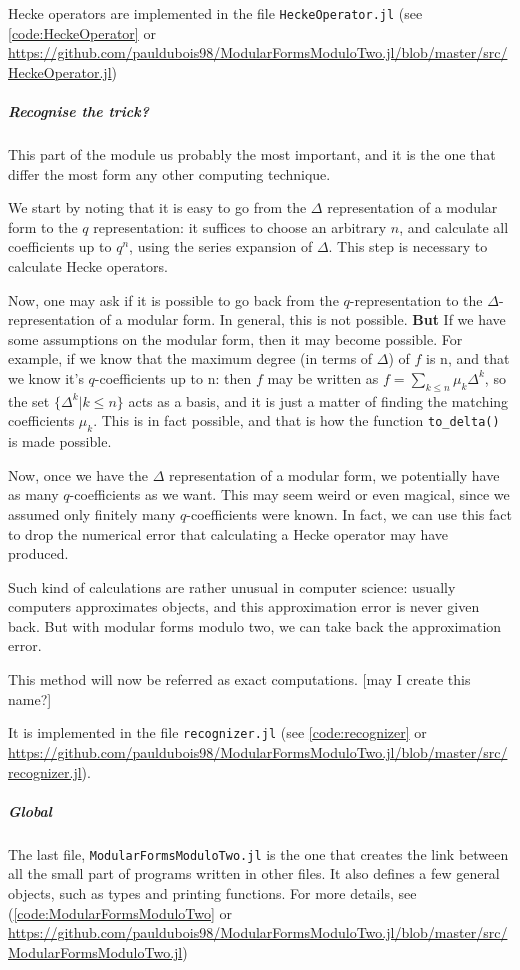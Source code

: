 Hecke operators are implemented in the file \texttt{HeckeOperator.jl} (see \ref{code:HeckeOperator} or \url{https://github.com/pauldubois98/ModularFormsModuloTwo.jl/blob/master/src/HeckeOperator.jl})
\subparagraph{Recognise the trick?}
\label{recogniseTrick}
This part of the module us probably the most important, and it is the one that differ the most form any other computing technique.

We start by noting that it is easy to go from the $\Delta$ representation of a modular form to the $q$ representation: it suffices to choose an arbitrary $n$, and calculate all coefficients up to $q^n$, using the series expansion of $\Delta$.
This step is necessary to calculate Hecke operators.

Now, one may ask if it is possible to go back from the $q$-representation to the $\Delta$-representation of a modular form.
In general, this is not possible.
\textbf{But}
If we have some assumptions on the modular form, then it may become possible.
For example, if we know that the maximum degree (in terms of $\Delta$) of $f$ is n, and that we know it's $q$-coefficients up to n:
then $f$ may be written as $f = \sum_{k \leq n} \mu_k \Delta^k$, so the set $\{ \Delta^k | k \leq n \}$ acts as a basis, and it is just a matter of finding the matching coefficients $\mu_k$.
This is in fact possible, and that is how the function \texttt{to\_delta()} is made possible.

Now, once we have the $\Delta$ representation of a modular form, we potentially have as many $q$-coefficients as we want.
This may seem weird or even magical, since we assumed only finitely many $q$-coefficients were known.
In fact, we can use this fact to drop the numerical error that calculating a Hecke operator may have produced.

Such kind of calculations are rather unusual in computer science: usually computers approximates objects, and this approximation error is never given back.
But with modular forms modulo two, we can take back the approximation error.

This method will now be referred as exact computations. [may I create this name?]

It is implemented in the file \texttt{recognizer.jl} (see \ref{code:recognizer} or \url{https://github.com/pauldubois98/ModularFormsModuloTwo.jl/blob/master/src/recognizer.jl}).
\subparagraph{Global}
The last file, \texttt{ModularFormsModuloTwo.jl} is the one that creates the link between all the small part of programs written in other files.
It also defines a few general objects, such as types and printing functions.
For more details, see (\ref{code:ModularFormsModuloTwo} or \url{https://github.com/pauldubois98/ModularFormsModuloTwo.jl/blob/master/src/ModularFormsModuloTwo.jl})
